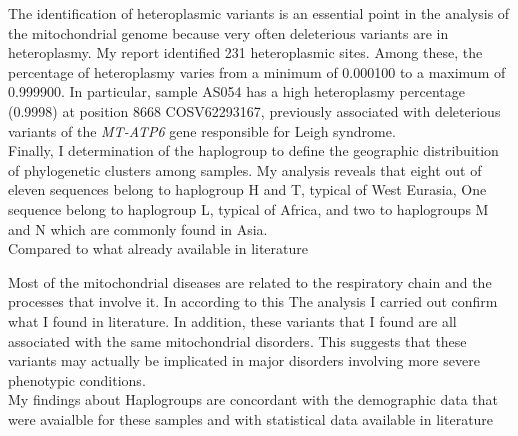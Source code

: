 The identification of heteroplasmic variants is an essential point in the analysis of the mitochondrial genome because very often deleterious variants are in heteroplasmy. My report identified 231 heteroplasmic sites. Among these, the percentage of heteroplasmy varies from a minimum of 0.000100  to a maximum of 0.999900.
In particular, sample AS054 has a high heteroplasmy percentage (0.9998) at position 8668 COSV62293167, previously associated with deleterious variants of the \textit{MT-ATP6} gene responsible for Leigh syndrome.
\\

Finally, I determination of the haplogroup to  define the geographic distribuition of phylogenetic clusters among samples. My analysis reveals that eight out of eleven sequences belong to haplogroup H and T, typical of West Eurasia, One sequence belong to haplogroup L, typical of Africa, and two to haplogroups M and N which are commonly found in Asia. \\



Compared to what already available in literature

Most of the mitochondrial diseases are related to the respiratory chain and the processes that involve it. In according to this The analysis I carried out confirm what I found in literature. 
In addition, these variants that I found are all associated with the same mitochondrial disorders. This suggests that these variants may actually be implicated in major disorders involving more severe phenotypic conditions.\\
My findings about Haplogroups are concordant with the demographic
data that were avaialble for these samples and with statistical
data available in literature \\

